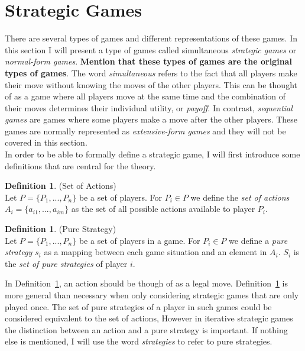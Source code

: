 \documentclass{article}
\theoremstyle{definition}
\newtheorem{definition}[theorem]{Definition}
\theoremstyle{remark}
\begin{document}
\section{Strategic Games}\label{Strategic Games}
There are several types of games and different representations of
these games. In this section I will present a type of games called
simultaneous \emph{strategic games} or \emph{normal-form
  games}. \textbf{Mention that these types of games are the original
  types of games}. The word \emph{simultaneous} refers to the fact that all
players make their move without knowing the moves of the other
players. This can be thought of as a game where all players move at
the same time and the combination of their moves determines their
individual utility, or \emph{payoff}. In contrast, \emph{sequential
  games} are games where some players make a move after the other
players. These games are normally represented as \emph{extensive-form
  games} and they will not be covered in this section. \\

In order to be able to formally define a strategic game, I
will first introduce some definitions that are central for the
theory.

\begin{definition} (Set of Actions) \label{Set of actions}\\
  Let $P = \{P_1,...,P_n\}$ be a set of players. For $P_i
  \in P$ we define the \emph{set of actions} $A_i =
  \{a_{i1},...,a_{im}\}$ as the set of all possible actions available
  to player $P_i$. 
  \end{definition}

\begin{definition} (Pure Strategy) \label{Strategy}\\
  Let $P = \{P_1,...,P_n\}$ be a set of players in a game. For $P_i
  \in P$ we define a \emph{pure strategy} $s_i$ as a mapping between each
  game situation and an element in $A_i$. $S_i$ is the \emph{set of
    pure strategies} of player $i$.
\end{definition}

In Definition~\ref{Set of actions}, an action should be though of as a
legal move. Definition~\ref{Strategy} is more general than necessary
when only considering strategic games that are only played once. The
set of pure strategies of a player in such games could be considered
equivalent to the set of actions, However in iterative strategic games
the distinction between an action and a pure strategy is
important. If nothing else is mentioned, I will use the word
\emph{strategies} to refer to pure strategies.   
\end{document}
